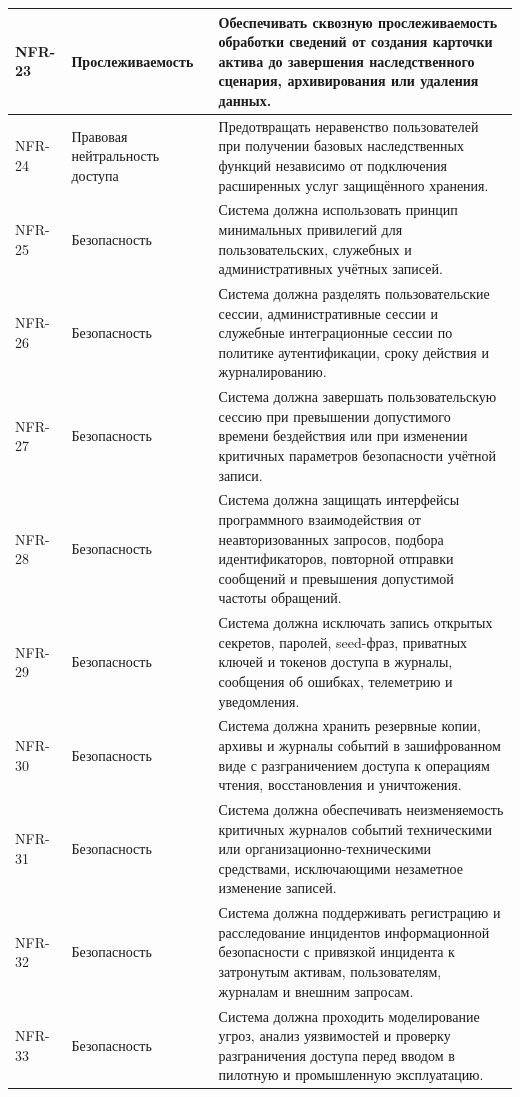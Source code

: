 \begin{longtable}{|P{1.45cm}|P{3.35cm}|P{10.7cm}|}
NFR-23 & Прослеживаемость & Обеспечивать сквозную прослеживаемость обработки сведений от создания карточки актива до завершения наследственного сценария, архивирования или удаления данных.\\ \hline
NFR-24 & Правовая нейтральность доступа & Предотвращать неравенство пользователей при получении базовых наследственных функций независимо от подключения расширенных услуг защищённого хранения.\\ \hline
NFR-25 & Безопасность & Система должна использовать принцип минимальных привилегий для пользовательских, служебных и административных учётных записей.\\ \hline
NFR-26 & Безопасность & Система должна разделять пользовательские сессии, административные сессии и служебные интеграционные сессии по политике аутентификации, сроку действия и журналированию.\\ \hline
NFR-27 & Безопасность & Система должна завершать пользовательскую сессию при превышении допустимого времени бездействия или при изменении критичных параметров безопасности учётной записи.\\ \hline
NFR-28 & Безопасность & Система должна защищать интерфейсы программного взаимодействия от неавторизованных запросов, подбора идентификаторов, повторной отправки сообщений и превышения допустимой частоты обращений.\\ \hline
NFR-29 & Безопасность & Система должна исключать запись открытых секретов, паролей, seed-фраз, приватных ключей и токенов доступа в журналы, сообщения об ошибках, телеметрию и уведомления.\\ \hline
NFR-30 & Безопасность & Система должна хранить резервные копии, архивы и журналы событий в зашифрованном виде с разграничением доступа к операциям чтения, восстановления и уничтожения.\\ \hline
NFR-31 & Безопасность & Система должна обеспечивать неизменяемость критичных журналов событий техническими или организационно-техническими средствами, исключающими незаметное изменение записей.\\ \hline
NFR-32 & Безопасность & Система должна поддерживать регистрацию и расследование инцидентов информационной безопасности с привязкой инцидента к затронутым активам, пользователям, журналам и внешним запросам.\\ \hline
NFR-33 & Безопасность & Система должна проходить моделирование угроз, анализ уязвимостей и проверку разграничения доступа перед вводом в пилотную и промышленную эксплуатацию.\\ \hline

\end{longtable}
